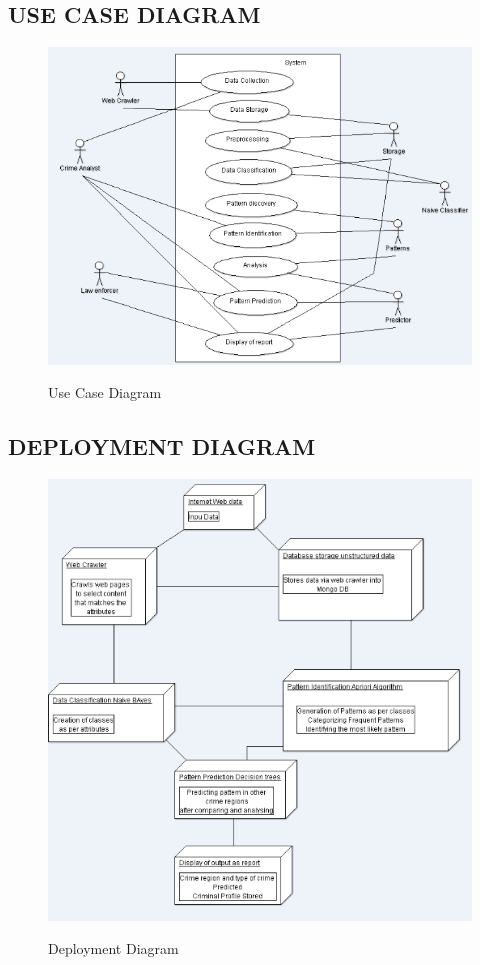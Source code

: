     \subsection*{USE CASE DIAGRAM}
    \begin{figure}[H]
    \centering
  \includegraphics[scale=0.75]{USECRIME.png}\\
  \caption{Use Case Diagram}
  
\end{figure}
    \pagebreak
    \subsection*{DEPLOYMENT DIAGRAM}
     \begin{figure}[H]
  \centering
  \includegraphics[scale=0.75]{DEPLOYDIAGRAM.png}\\
  \caption{Deployment Diagram}
  \end{figure}
  \pagebreak  
